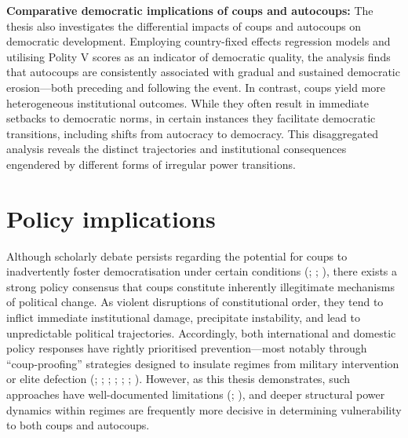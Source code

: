 \documentclass[
  12pt,
]{report}
\begin{document}
\textbf{Comparative democratic implications of coups and autocoups:} The
thesis also investigates the differential impacts of coups and autocoups
on democratic development. Employing country-fixed effects regression
models and utilising Polity V scores as an indicator of democratic
quality, the analysis finds that autocoups are consistently associated
with gradual and sustained democratic erosion---both preceding and
following the event. In contrast, coups yield more heterogeneous
institutional outcomes. While they often result in immediate setbacks to
democratic norms, in certain instances they facilitate democratic
transitions, including shifts from autocracy to democracy. This
disaggregated analysis reveals the distinct trajectories and
institutional consequences engendered by different forms of irregular
power transitions.

\section{Policy implications}\label{policy-implications}

Although scholarly debate persists regarding the potential for coups to
inadvertently foster democratisation under certain conditions
(;
;
), there exists a strong policy
consensus that coups constitute inherently illegitimate mechanisms of
political change. As violent disruptions of constitutional order, they
tend to inflict immediate institutional damage, precipitate instability,
and lead to unpredictable political trajectories. Accordingly, both
international and domestic policy responses have rightly prioritised
prevention---most notably through ``coup-proofing'' strategies designed
to insulate regimes from military intervention or elite defection
(;
;
;
;
;
;
). However, as this thesis
demonstrates, such approaches have well-documented limitations
(;
), and deeper structural power
dynamics within regimes are frequently more decisive in determining
vulnerability to both coups and autocoups.
\end{document}
